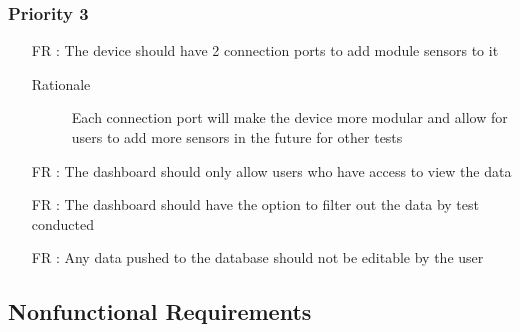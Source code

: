 \documentclass[12pt]{article}
\newcounter{reqnum} %
\begin{document}
\subsubsection{Priority 3}
\begin{itemize}
  \item[FR \refstepcounter{reqnum}\thereqnum:] The device should have 2 connection ports to add module sensors to it
  \begin{description} \item[Rationale] Each connection port will make the device more modular and allow for users to add more sensors in the future for other tests  \end{description}

  \item[FR \refstepcounter{reqnum}\thereqnum:] The dashboard should only allow users who have access to view the data
  
  \item[FR \refstepcounter{reqnum}\thereqnum:] The dashboard should have the option to filter out the data by test conducted
  
  \item[FR \refstepcounter{reqnum}\thereqnum:] Any data pushed to the database should not be editable by the user
  
  
  \end{itemize}

\newpage
\subsection{Nonfunctional Requirements}
\end{document}
